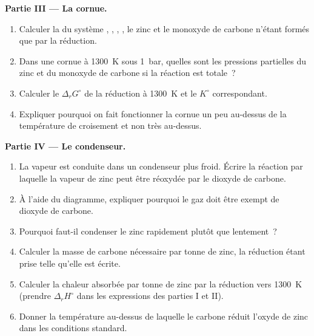 \begin{problem}
\medskip
\noindent\textbf{Partie III --- La cornue.}
\begin{enumerate}[resume]
  \item Calculer la  du système , , ,
        , le zinc et le monoxyde de carbone n'étant formés que par la réduction.
  \item Dans une cornue à \qty{1300}{K} sous \qty{1}{bar}, quelles sont les pressions
        partielles du zinc et du monoxyde de carbone si la réaction est totale~?
  \item Calculer le $\Delta_r G^\circ$ de la réduction à \qty{1300}{K} et le
        $K^\circ$ correspondant.
  \item Expliquer pourquoi on fait fonctionner la cornue un peu au-dessus de la température de
        croisement et non très au-dessus.
\end{enumerate}

\medskip
\noindent\textbf{Partie IV --- Le condenseur.}
\begin{enumerate}[resume]
  \item La vapeur est conduite dans un condenseur plus froid. Écrire la réaction par laquelle
        la vapeur de zinc peut être réoxydée par le dioxyde de carbone.
  \item À l'aide du diagramme, expliquer pourquoi le gaz doit être exempt de dioxyde
        de carbone.
  \item Pourquoi faut-il condenser le zinc rapidement plutôt que lentement~?
  \item Calculer la masse de carbone nécessaire par tonne de zinc, la
        réduction étant prise telle qu'elle est écrite.
  \item Calculer la chaleur absorbée par tonne de zinc par la réduction vers
        \qty{1300}{K} (prendre $\Delta_r H^\circ$ dans les expressions des parties I
        et II).
  \item Donner la température au-dessus de laquelle le carbone réduit l'oxyde de zinc dans
        les conditions standard.
\end{enumerate}
\end{problem}

